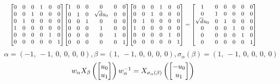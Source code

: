 \documentclass[11pt]{article}
\theoremstyle{definition}
\begin{document}
\[
\scaletoalign{\textwidth}{{\left[\begin{matrix}0 & 0 & 0 & 1 & 0 & 0\\0 & 0 & 1 & 0 & 0 & 0\\0 & 1 & 0 & 0 & 0 & 0\\1 & 0 & 0 & 0 & 0 & 0\\0 & 0 & 0 & 0 & 1 & 0\\0 & 0 & 0 & 0 & 0 & 1\end{matrix}\right]} {\left[\begin{matrix}1 & 0 & 0 & 0 & 0 & 0\\0 & 1 & 0 & \sqrt{d} u_{0} & 0 & 0\\0 & 0 & 1 & 0 & 0 & 0\\0 & 0 & 0 & 1 & 0 & 0\\0 & 0 & 0 & 0 & 1 & 0\\0 & 0 & 0 & 0 & 0 & 1\end{matrix}\right]} {\left[\begin{matrix}0 & 0 & 0 & 1 & 0 & 0\\0 & 0 & 1 & 0 & 0 & 0\\0 & 1 & 0 & 0 & 0 & 0\\1 & 0 & 0 & 0 & 0 & 0\\0 & 0 & 0 & 0 & 1 & 0\\0 & 0 & 0 & 0 & 0 & 1\end{matrix}\right]} = {\left[\begin{matrix}1 & 0 & 0 & 0 & 0 & 0\\0 & 1 & 0 & 0 & 0 & 0\\\sqrt{d} u_{0} & 0 & 1 & 0 & 0 & 0\\0 & 0 & 0 & 1 & 0 & 0\\0 & 0 & 0 & 0 & 1 & 0\\0 & 0 & 0 & 0 & 0 & 1\end{matrix}\right]}}
\]
\[
\alpha = \left( -1, \  -1, \  0, \  0, \  0, \  0\right), \beta = \left( 1, \  -1, \  0, \  0, \  0, \  0\right), \sigma_{\alpha}(\beta) = \left( 1, \  -1, \  0, \  0, \  0, \  0\right)
\]
\[
\scaletoalign{\textwidth}{w_{\alpha} X_{\beta}\left(\left[\begin{matrix}u_{0}\\u_{1}\end{matrix}\right]\right) w_{\alpha}^{-1} = X_{\sigma_{\alpha}\left(\beta\right)}\left(\left[\begin{matrix}- u_{0}\\u_{1}\end{matrix}\right]\right)}
\]
\end{document}
